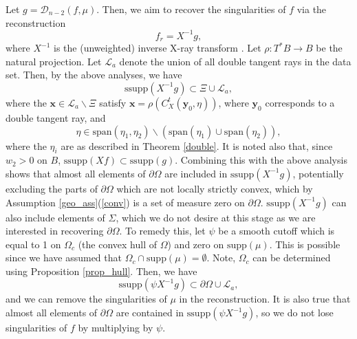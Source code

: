 \documentclass[a4paper,12pt]{amsart}
\numberwithin{equation}{section}
\theoremstyle{plain}
\numberwithin{theorem}{section}
\theoremstyle{definition}
\theoremstyle{remark}
\theoremstyle{remark}
\theoremstyle{remark}
\newcommand{\paren}[1]{\left(#1\right)}               %
\newcommand{\vx}{{\mathbf{x}}}
\newcommand{\vy}{{\mathbf{y}}}
\newcommand{\ssupp}{\text{ssupp}}
\begin{document}
{Let $g = \mathcal{D}_{n-2}(f,\mu)$. Then, we aim to recover the singularities of $f$ via the reconstruction
\begin{equation}
f_r = X^{-1}g,
\end{equation}
where $X^{-1}$ is the (unweighted) inverse X-ray transform \cite[Theorem 2.1]{natterer}. Let $\rho : T^*B \to B$ be the natural projection. Let $\mathcal{L}_a$ denote the union of all double tangent rays in the data set. Then, by the above analyses, we have
\begin{equation}
\ssupp(X^{-1}g) \subset \Xi \cup \mathcal{L}_a,
\end{equation}
where the $\vx \in \mathcal{L}_a\backslash \Xi$ satisfy $\vx = \rho\paren{ C_X^t(\vy_0,\eta) }$, where $\vy_0$ corresponds to a double tangent ray, and
$$\eta \in \text{span}(\eta_1,\eta_2) \backslash (\text{span}(\eta_1) \cup \text{span}(\eta_2)),$$
where the $\eta_i$ are as described in Theorem \ref{double}. It is noted also that, since $w_2 > 0$ on $B$, $\text{ssupp}(Xf) \subset \text{ssupp}(g)$. Combining this with the above analysis shows that almost all elements of $\partial \Omega$ are included in $\ssupp(X^{-1}g)$, potentially excluding the parts of $\partial \Omega$ which are not locally strictly convex, which by Assumption \ref{geo_ass}(\ref{conv}) is a set of measure zero on $\partial \Omega$. $\ssupp(X^{-1}g)$ can also include elements of $\Sigma$, which we do not desire at this stage as we are interested in recovering $\partial \Omega$. To remedy this, let $\psi$ be a smooth cutoff which is equal to 1 on $\Omega_c$ (the convex hull of $\Omega$) and zero on $\text{supp}(\mu)$. This is possible since we have assumed that $\Omega_c\cap \text{supp}(\mu) = \emptyset$. Note, $\Omega_c$ can be determined using Proposition \ref{prop_hull}. Then, we have 
\begin{equation}
\ssupp(\psi X^{-1}g) \subset \partial \Omega \cup \mathcal{L}_a,
\end{equation}
and we can remove the singularities of $\mu$ in the reconstruction. It is also true that almost all elements of $\partial \Omega$ are contained in $\ssupp(\psi X^{-1}g)$, so we do not lose singularities of $f$ by multiplying by $\psi$.

}
\end{document}
